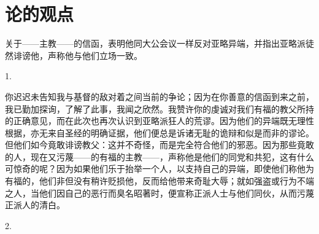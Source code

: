 
\chapter{论的观点}


\par

关于——主教——的信函，表明他同大公会议一样反对亚略异端，并指出亚略派徒然诽谤他，声称他与他们立场一致。\par

1. \par

你迟迟未告知我与基督的敌对着之间当前的争论；因为在你善意的信函到来之前，我已勤加探询，了解了此事，我闻之欣然。我赞许你的虔诚对我们有福的教父所持的正确意见，而在此次也再次认识到亚略派狂人的荒谬。因为他们的异端既无理性根据，亦无来自圣经的明确证据，他们便总是诉诸无耻的诡辩和似是而非的谬论。但他们如今竟敢诽谤教父：这并不奇怪，而是完全符合他们的邪恶。因为那些竟敢的人，现在又污蔑——的有福的主教——，声称他是他们的同党和共犯，这有什么可惊奇的呢？因为如果他们乐于抬举一个人，以支持自己的异端，即使他们称他为有福的，他们非但没有稍许贬损他，反而给他带来奇耻大辱；就如强盗或行为不端之人，当他们因自己的恶行而臭名昭著时，便宣称正派人士与他们同伙，从而污蔑正派人的清白。\par

2. \par

